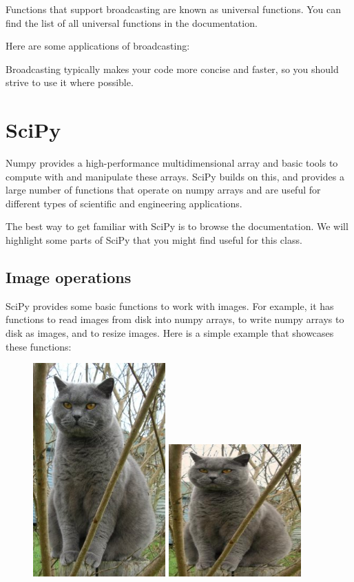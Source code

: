 \documentclass[10pt,a4paper]{article}
\begin{document}
Functions that support broadcasting are known as universal functions. You can find the list of all universal functions in the documentation.

Here are some applications of broadcasting:


Broadcasting typically makes your code more concise and faster, so you should strive to use it where possible.


\section{SciPy}

Numpy provides a high-performance multidimensional array and basic tools to compute with and manipulate these arrays. SciPy builds on this, and provides a large number of functions that operate on numpy arrays and are useful for different types of scientific and engineering applications.

The best way to get familiar with SciPy is to browse the documentation. We will highlight some parts of SciPy that you might find useful for this class.


\subsection{Image operations}

SciPy provides some basic functions to work with images. For example, it has functions to read images from disk into numpy arrays, to write numpy arrays to disk as images, and to resize images. Here is a simple example that showcases these functions:


\begin{figure}[htbp]
\centering
\includegraphics[width=2in]{images/cat.jpg}
\includegraphics[width=2in]{images/cat_tinted.jpg}
\end{figure}
\end{document}
